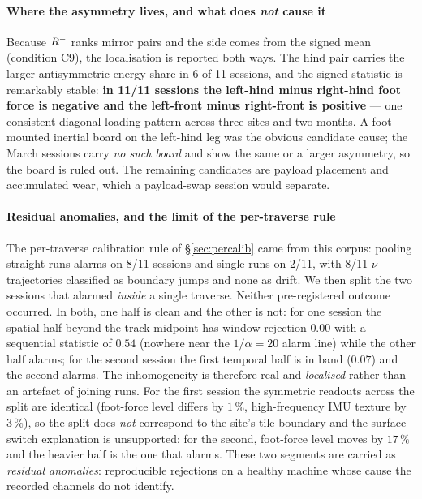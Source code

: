 \paragraph{Where the asymmetry lives, and what does \emph{not} cause it}
Because $R^{-}$ ranks mirror pairs and the side comes from the signed mean (condition C9), the localisation is
reported both ways. The hind pair carries the larger antisymmetric energy share in 6 of 11 sessions, and the signed
statistic is remarkably stable: \textbf{in 11/11 sessions the left-hind minus right-hind foot force is negative and the
left-front minus right-front is positive} --- one consistent diagonal loading pattern across three sites and two
months. A foot-mounted inertial board on the left-hind leg was the obvious candidate cause; the March sessions carry
\emph{no such board} and show the same or a larger asymmetry, so the board is ruled out. The remaining candidates are
payload placement and accumulated wear, which a payload-swap session would separate.

\paragraph{Residual anomalies, and the limit of the per-traverse rule}
The per-traverse calibration rule of \S\ref{sec:percalib} came from this corpus: pooling straight runs alarms on 8/11
sessions and single runs on 2/11, with 8/11 $\nu$-trajectories classified as boundary jumps and none as drift. We then
split the two sessions that alarmed \emph{inside} a single traverse. Neither pre-registered outcome occurred. In both,
one half is clean and the other is not: for one session the spatial half beyond the track midpoint has window-rejection
$0.00$ with a sequential statistic of $0.54$ (nowhere near the $1/\alpha=20$ alarm line) while the other half alarms;
for the second session the first temporal half is in band ($0.07$) and the second alarms. The inhomogeneity is
therefore real and \emph{localised} rather than an artefact of joining runs. For the first session the symmetric
readouts across the split are identical (foot-force level differs by $1\,\%$, high-frequency IMU texture by $3\,\%$), so
the split does \emph{not} correspond to the site's tile boundary and the surface-switch explanation is unsupported; for
the second, foot-force level moves by $17\,\%$ and the heavier half is the one that alarms. These two segments are
carried as \emph{residual anomalies}: reproducible rejections on a healthy machine whose cause the recorded channels do
not identify.

